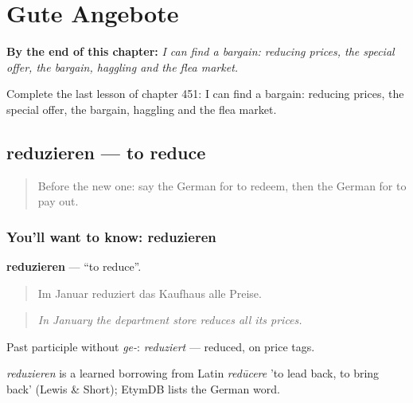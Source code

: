 
\chapter{Gute Angebote}
\label{ch:ge-gute-angebote}

\begin{chapteropening}
\textbf{By the end of this chapter:} \emph{I can find a bargain: reducing prices, the special offer, the bargain, haggling and the flea market.}

Complete the last lesson of chapter 451: I can find a bargain: reducing prices, the special offer, the bargain, haggling and the flea market.
\end{chapteropening}

\section[reduzieren]{reduzieren — to reduce}

\label{lesson:GE-C451-reduzieren}



\begin{quote}
Before the new one: say the German for to redeem, then the German for to pay out.
\end{quote}

\subsection*{You'll want to know: reduzieren}
\textbf{reduzieren} — \textquotedblleft{}to reduce\textquotedblright{}.

\begin{quote}
Im Januar reduziert das Kaufhaus alle Preise.
\end{quote}

\begin{quote}
\emph{In January the department store reduces all its prices.}
\end{quote}

Past participle without \emph{ge-}: \emph{reduziert} — reduced, on price tags.

\begin{cousinweb}
\emph{reduzieren} is a learned borrowing from Latin \emph{redūcere} 'to lead back, to bring back' (Lewis \& Short); EtymDB lists the German word.
\end{cousinweb}

